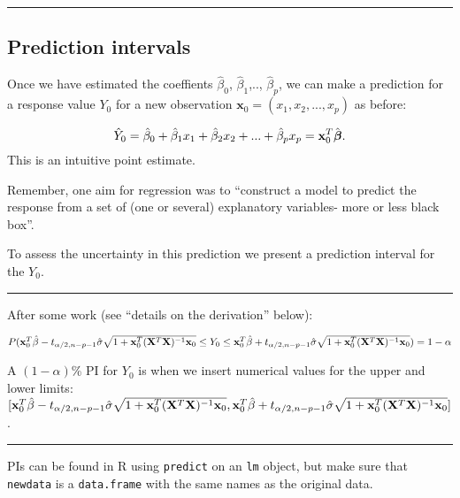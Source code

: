 \documentclass[]{article}
\begin{document}
\normalsize

\begin{center}\rule{0.5\linewidth}{\linethickness}\end{center}

\hypertarget{prediction-intervals}{%
\subsection{Prediction intervals}\label{prediction-intervals}}

Once we have estimated the coeffients \(\hat\beta_0\),
\(\hat\beta_1\),.., \(\hat\beta_p\), we can make a prediction for a
response value \(Y_0\) for a new observation
\(\mathbf x_0 = (x_1, x_2, ..., x_p)\) as before:

\[\hat Y_0 = \hat \beta_0 + \hat \beta_1 x_1 + \hat \beta_2 x_2 + ... + \hat \beta_p x_p ={\bf x}_0^T \hat{\boldsymbol\beta}.\]
This is an intuitive point estimate.

Remember, one aim for regression was to ``construct a model to predict
the response from a set of (one or several) explanatory variables- more
or less black box''.

To assess the uncertainty in this prediction we present a prediction
interval for the \(Y_0\).

\begin{center}\rule{0.5\linewidth}{\linethickness}\end{center}

After some work (see ``details on the derivation'' below):

\(P({\bf x}_0^T \hat{\beta}-t_{\alpha/2,n-p-1}\hat{\sigma}\sqrt{1+{\bf x}_0^T({\bf X}^T{\bf X})^{-1}{\bf x}_0} \le Y_0 \le {\bf x}_0^T \hat{\beta}+t_{\alpha/2,n-p-1}\hat{\sigma}\sqrt{1+{\bf x}_0^T({\bf X}^T{\bf X})^{-1}{\bf x}_0})=1-\alpha\)

A \((1-\alpha)\)\% PI for \(Y_0\) is when we insert numerical values for
the upper and lower limits:
\([{\bf x}_0^T \hat{\beta}-t_{\alpha/2,n-p-1}\hat{\sigma}\sqrt{1+{\bf x}_0^T({\bf X}^T{\bf X})^{-1}{\bf x}_0}, {\bf x}_0^T \hat{\beta}+t_{\alpha/2,n-p-1}\hat{\sigma}\sqrt{1+{\bf x}_0^T({\bf X}^T{\bf X})^{-1}{\bf x}_0}]\).

\begin{center}\rule{0.5\linewidth}{\linethickness}\end{center}

PIs can be found in R using \texttt{predict} on an \texttt{lm} object,
but make sure that \texttt{newdata} is a \texttt{data.frame} with the
same names as the original data.
\end{document}
